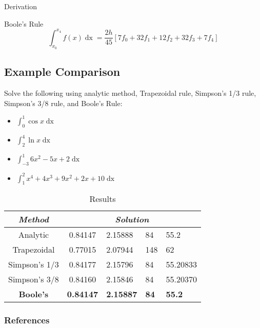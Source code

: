 \documentclass{beamer}
\begin{document}
\begin{frame}{Derivation}
  \begin{definition}{Boole's Rule}   
    \begin{equation}\label{booles}
        \int_{x_0}^{x_4} f(x) \mathop{dx} = \dfrac{2h}{45}\left[7f_0 + 32f_1 + 12f_2 + 32f_3 + 7f_4\right]
    \end{equation}
  \end{definition}
\end{frame}

\subsection{Example Comparison \cite{calculator}}

\begin{frame}
  Solve the following using analytic method, Trapezoidal rule, Simpson's 1/3 rule, Simpson's 3/8 rule, and \alert{Boole's Rule}:
  \begin{itemize}
    \item $\int_0^1 \cos{x} \mathop{dx}$
    \item $\int_2^4 \ln{x} \mathop{dx}$
    \item $\int_{-3}^1 6x^2 - 5x + 2 \mathop{dx}$
    \item $\int_{1}^2 x^4 +4x^3 + 9x^2 + 2x + 10 \mathop{dx}$
  \end{itemize}
\end{frame}

\begin{frame}
\begin{table}[]
\centering
\caption{Results}
\label{my-label}
\begin{tabular}{|c|c|l|l|l|}
\hline
\textit{\textbf{Method}} & \multicolumn{4}{c|}{\textit{\textbf{Solution}}}                   \\ \hline
Analytic                 & 0.84147          & 2.15888          & 84          & 55.2          \\ \hline
Trapezoidal              & 0.77015          & 2.07944          & 148         & 62            \\ \hline
Simpson's 1/3            & 0.84177          & 2.15796          & 84          & 55.20833      \\ \hline
Simpson's 3/8            & 0.84160          & 2.15846          & 84          & 55.20370      \\ \hline
\textbf{Boole's}         & \textbf{0.84147} & \textbf{2.15887} & \textbf{84} & \textbf{55.2} \\ \hline
\end{tabular}
\end{table}
\end{frame}

\begin{frame}[t,allowframebreaks]
  \frametitle{References}
  \printbibliography
\end{frame}
\end{document}
